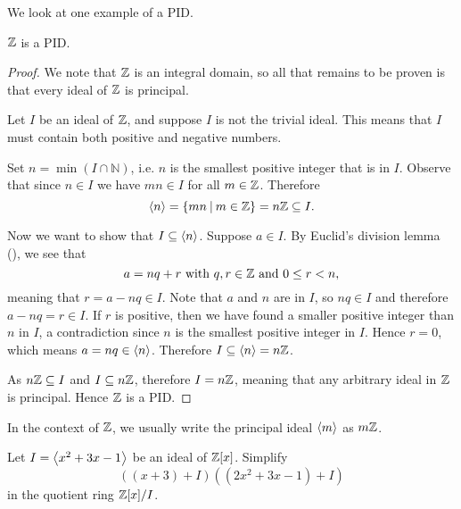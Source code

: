 We look at one example of a PID.
\begin{proposition}
    $\mathbb{Z}$ is a PID.
\end{proposition}
\begin{proof}
    We note that $\mathbb{Z}$ is an integral domain, so all that remains to be proven is that every ideal of $\mathbb{Z}$ is principal.

    Let $I$ be an ideal of $\mathbb{Z}$, and suppose $I$ is not the trivial ideal. This means that $I$ must contain both positive and negative numbers.
    
    Set $n = \min(I \cap \mathbb{N})$, i.e. $n$ is the smallest positive integer that is in $I$. Observe that since $n \in I$ we have $mn \in I$ for all $m \in \mathbb{Z}$. Therefore
    \[
        \princ{n} = \{mn \vert m \in \Z\} = n\Z \subseteq I.
    \]

    Now we want to show that $I \subseteq \left\langle n\right\rangle$. Suppose $a \in I$. By Euclid's division lemma (), we see that
    \[
        a = nq + r \text{ with } q,r\in\mathbb{Z} \text{ and } 0 \leq r < n,
    \]
    meaning that $r = a - nq \in I$. Note that $a$ and $n$ are in $I$, so $nq \in I$ and therefore $a - nq = r \in I$. If $r$ is positive, then we have found a smaller positive integer than $n$ in $I$, a contradiction since $n$ is the smallest positive integer in $I$. Hence $r = 0$, which means $a = nq \in \left\langle n\right\rangle$. Therefore $I \subseteq \left\langle n\right\rangle = n\mathbb{Z}$.

    As $n\mathbb{Z} \subseteq I$ and $I \subseteq n\mathbb{Z}$, therefore $I = n\mathbb{Z}$, meaning that any arbitrary ideal in $\mathbb{Z}$ is principal. Hence $\mathbb{Z}$ is a PID.
\end{proof}
\begin{remark}
    In the context of $\mathbb{Z}$, we usually write the principal ideal $\left\langle m\right\rangle$ as $m\mathbb{Z}$.
\end{remark}
\begin{exercise}
    Let $I = \left\langle x^2 + 3x - 1\right\rangle$ be an ideal of $\mathbb{Z}[x]$. Simplify
    \[
        \left((x + 3) + I\right)\left((2x^2 + 3x - 1) + I\right)
    \]
    in the quotient ring $\mathbb{Z}[x]/I$.
\end{exercise}

\newpage

